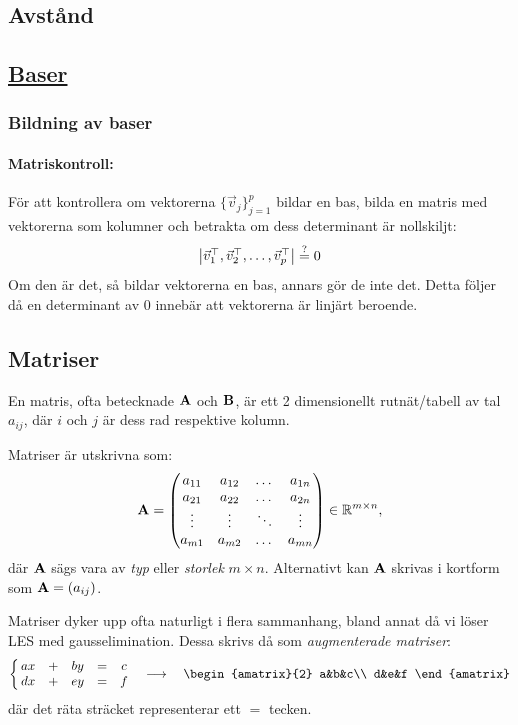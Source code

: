 \subsection{Avstånd}

\subsection{\href{https://sv.wikipedia.org/wiki/Bas_(linjär_algebra)}{Baser}}

\subsubsection{Bildning av baser}

\paragraph{Matriskontroll:}
För att kontrollera om vektorerna $\{\vec{v}_j\}_{j=1}^p$ bildar en bas,
bilda en matris med vektorerna som kolumner och betrakta om dess determinant är nollskiljt:
$$
	\qty|\begin{matrix}
		\vec{v}_1^\top,\vec{v}_2^\top,\dots,\vec{v}_p^\top
	\end{matrix}|\stackrel{?}{=}0
$$
Om den är det, så bildar vektorerna en bas, annars gör de inte det.
Detta följer då en determinant av $0$ innebär att vektorerna är linjärt beroende.

\subsection{Matriser}\label{s:matris}
En matris, ofta betecknade $\mathbf{A}$ och $\mathbf{B}$, är ett 2 dimensionellt
rutnät/tabell av tal $a_{ij}$, där $i$ och $j$ är dess rad respektive kolumn.

Matriser är utskrivna som:
$$
\mathbf{A}=\qty(\begin{matrix}
	a_{11}&a_{12}&\dots&a_{1n}\\
	a_{21}&a_{22}&\dots&a_{2n}\\
	\vdots&\vdots&\ddots&\vdots\\
	a_{m1}&a_{m2}&\dots&a_{mn}
\end{matrix})\in\mathbb{R}^{m\times n},
$$
där $\mathbf{A}$ sägs vara av \emph{typ} eller \emph{storlek} $m\times n$. 
Alternativt kan $\mathbf{A}$ skrivas i kortform som $\mathbf{A}=(a_{ij})$.

Matriser dyker upp ofta naturligt i flera sammanhang, bland annat då vi löser
LES med gausselimination. Dessa skrivs då som \emph{augmenterade matriser}:
$$
	\left\{\,\begin{matrix}
		ax&+&by&=&c\\
		dx&+&ey&=&f
	\end{matrix}\right.\quad\longrightarrow\quad\begin{amatrix}{2}
		a&b&c\\
		d&e&f
	\end{amatrix}
$$
där det räta sträcket representerar ett $=$ tecken.

